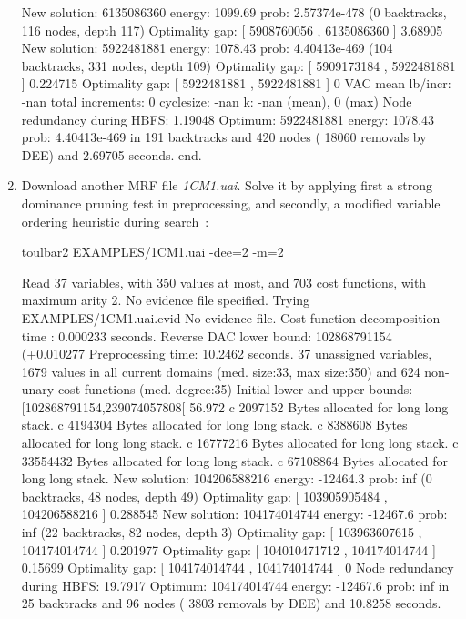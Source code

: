 \begin{enumerate}
{\begin{DoxyCode}
New solution: 6135086360 energy: 1099.69 prob: 2.57374e-478 (0 backtracks, 116 nodes, depth 117)
Optimality gap: [ 5908760056 , 6135086360 ] 3.68905 %
New solution: 5922481881 energy: 1078.43 prob: 4.40413e-469 (104 backtracks, 331 nodes, depth 109)
Optimality gap: [ 5909173184 , 5922481881 ] 0.224715 %
Optimality gap: [ 5922481881 , 5922481881 ] 0 %
VAC mean lb/incr: -nan     total increments: 0     cyclesize: -nan     k: -nan (mean), 0 (max)
Node redundancy during HBFS: 1.19048 %
Optimum: 5922481881 energy: 1078.43 prob: 4.40413e-469 in 191 backtracks and 420 nodes ( 18060 removals by DEE) and 2.69705 seconds.
end.
\end{DoxyCode}}
\item Download another MRF file {\em 1CM1.uai}. Solve it by applying first a strong dominance pruning test in preprocessing, and secondly, a modified variable ordering heuristic during search~\cite{Schiex14a}:
\begin{DoxyCode}
	toulbar2 EXAMPLES/1CM1.uai -dee=2 -m=2
\end{DoxyCode}
{\scriptsize
\begin{DoxyCode}
Read 37 variables, with 350 values at most, and 703 cost functions, with maximum arity 2.
No evidence file specified. Trying EXAMPLES/1CM1.uai.evid
No evidence file. 
Cost function decomposition time : 0.000233 seconds.
Reverse DAC lower bound: 102868791154 (+0.010277%
Preprocessing time: 10.2462 seconds.
37 unassigned variables, 1679 values in all current domains (med. size:33, max size:350) and 624 non-unary cost functions (med. degree:35)
Initial lower and upper bounds: [102868791154,239074057808[ 56.972%
c 2097152 Bytes allocated for long long stack.
c 4194304 Bytes allocated for long long stack.
c 8388608 Bytes allocated for long long stack.
c 16777216 Bytes allocated for long long stack.
c 33554432 Bytes allocated for long long stack.
c 67108864 Bytes allocated for long long stack.
New solution: 104206588216 energy: -12464.3 prob: inf (0 backtracks, 48 nodes, depth 49)
Optimality gap: [ 103905905484 , 104206588216 ] 0.288545 %
New solution: 104174014744 energy: -12467.6 prob: inf (22 backtracks, 82 nodes, depth 3)
Optimality gap: [ 103963607615 , 104174014744 ] 0.201977 %
Optimality gap: [ 104010471712 , 104174014744 ] 0.15699 %
Optimality gap: [ 104174014744 , 104174014744 ] 0 %
Node redundancy during HBFS: 19.7917 %
Optimum: 104174014744 energy: -12467.6 prob: inf in 25 backtracks and 96 nodes ( 3803 removals by DEE) and 10.8258 seconds.

\end{DoxyCode}}
\end{enumerate}

